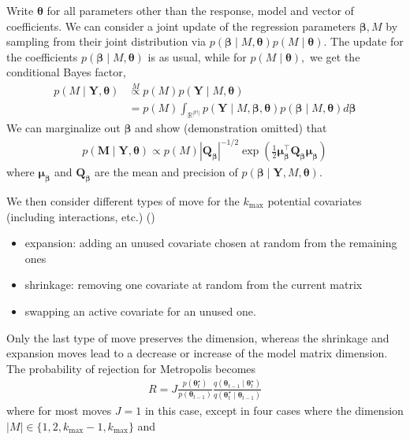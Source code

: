 \documentclass[
  11pt,
  letterpaper,
]{scrbook}
\providecommand{\tightlist}{%
  \setlength{\itemsep}{0pt}\setlength{\parskip}{0pt}}
\theoremstyle{definition}
\theoremstyle{plain}
\theoremstyle{plain}
\theoremstyle{plain}
\theoremstyle{definition}
\theoremstyle{definition}
\theoremstyle{plain}
\theoremstyle{plain}
\theoremstyle{remark}
\begin{document}
Write \(\boldsymbol{\theta}\) for all parameters other than the
response, model and vector of coefficients. We can consider a joint
update of the regression parameters \(\boldsymbol{\beta}, M\) by
sampling from their joint distribution via
\(p(\boldsymbol{\beta} \mid M, \boldsymbol{\theta}) p(M \mid \boldsymbol{\theta}).\)
The update for the coefficients
\(p(\boldsymbol{\beta} \mid M, \boldsymbol{\theta})\) is as usual, while
for \(p(M \mid \boldsymbol{\theta}),\) we get the conditional Bayes
factor, \begin{align*}
 p(M \mid \boldsymbol{Y}, \boldsymbol{\theta}) &\stackrel{M}{\propto} p(M) p(\boldsymbol{Y} \mid M, \boldsymbol{\theta})
 \\&= p(M) \int_{\mathbb{R}^{\mathbb{|M|}}}p(\boldsymbol{Y} \mid M, \boldsymbol{\beta},\boldsymbol{\theta}) p(\boldsymbol{\beta} \mid M, \boldsymbol{\theta}) d \boldsymbol{\beta}
\end{align*} We can marginalize out \(\boldsymbol{\beta}\) and show
(demonstration omitted) that \begin{align*}
p(\boldsymbol{M} \mid \boldsymbol{Y}, \boldsymbol{\theta}) \propto p(M) |\boldsymbol{Q}_{\boldsymbol{\beta}}|^{-1/2}\exp\left( \frac{1}{2} \boldsymbol{\mu}_{\boldsymbol{\beta}}^\top\boldsymbol{Q}_{\boldsymbol{\beta}} \boldsymbol{\mu}_{\boldsymbol{\beta}}\right)
\end{align*} where \(\boldsymbol{\mu}_{\boldsymbol{\beta}}\) and
\(\boldsymbol{Q}_{\boldsymbol{\beta}}\) are the mean and precision of
\(p(\boldsymbol{\beta} \mid \boldsymbol{Y}, M, \boldsymbol{\theta}).\)

We then consider different types of move for the \(k_{\max}\) potential
covariates (including interactions, etc.)
()

\begin{itemize}
\tightlist
\item
  expansion: adding an unused covariate chosen at random from the
  remaining ones
\item
  shrinkage: removing one covariate at random from the current matrix
\item
  swapping an active covariate for an unused one.
\end{itemize}

Only the last type of move preserves the dimension, whereas the
shrinkage and expansion moves lead to a decrease or increase of the
model matrix dimension. The probability of rejection for Metropolis
becomes \begin{align*}
R = J\frac{p(\boldsymbol{\theta}_t^{\star})}{p(\boldsymbol{\theta}_{t-1})}\frac{q(\boldsymbol{\theta}_{t-1} \mid \boldsymbol{\theta}_t^{\star} )}{q(\boldsymbol{\theta}_t^{\star} \mid \boldsymbol{\theta}_{t-1})}
\end{align*} where for most moves \(J=1\) in this case, except in four
cases where the dimension \(|M| \in\{1, 2, k_{\max}-1, k_{\max}\}\) and
\end{document}
